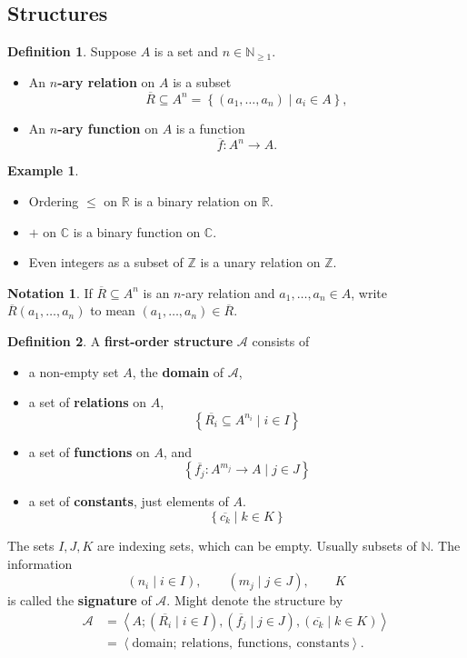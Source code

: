 \documentclass{article}
\newcommand{\N}{\mathbb{N}}
\newcommand{\Z}{\mathbb{Z}}
\newcommand{\R}{\mathbb{R}}
\newcommand{\C}{\mathbb{C}}
\newcommand{\A}{\mathcal{A}}
\newcommand{\rb}[1]{\left( #1 \right)}
\newcommand{\cb}[1]{\left\{ #1 \right\}}
\newcommand{\ab}[1]{\left\langle #1 \right\rangle}
\theoremstyle{definition}\newtheorem{definition}{Definition}[subsection]
\theoremstyle{definition}\newtheorem{remark1}[definition]{Remark}
\theoremstyle{definition}\newtheorem{example1}[definition]{Example}
\theoremstyle{definition}\newtheorem*{remark2}{Remark}
\theoremstyle{definition}\newtheorem*{example2}{Example}
\theoremstyle{definition}\newtheorem*{note}{Note}
\theoremstyle{definition}\newtheorem*{notation}{Notation}
\begin{document}
\subsection{Structures}

\begin{definition}
Suppose $ A $ is a set and $ n \in \N_{\ge 1} $.
\begin{itemize}
\item An \textbf{$ n $-ary relation} on $ A $ is a subset
$$ \overline{R} \subseteq A^n = \cb{\rb{a_1, \dots, a_n} \mid a_i \in A}, $$
\item An \textbf{$ n $-ary function} on $ A $ is a function
$$ \overline{f} : A^n \to A. $$
\end{itemize}
\end{definition}

\begin{example2}
\hfill
\begin{itemize}
\item Ordering $ \le $ on $ \R $ is a binary relation on $ \R $.
\item $ + $ on $ \C $ is a binary function on $ \C $.
\item Even integers as a subset of $ \Z $ is a unary relation on $ \Z $.
\end{itemize}
\end{example2}

\begin{notation}
If $ \overline{R} \subseteq A^n $ is an $ n $-ary relation and $ a_1, \dots, a_n \in A $, write $ \overline{R}\rb{a_1, \dots, a_n} $ to mean $ \rb{a_1, \dots, a_n} \in \overline{R} $.
\end{notation}

\begin{definition}
A \textbf{first-order structure} $ \A $ consists of
\begin{itemize}
\item a non-empty set $ A $, the \textbf{domain} of $ \A $,
\item a set of \textbf{relations} on $ A $,
$$ \cb{\overline{R_i} \subseteq A^{n_i} \mid i \in I} $$
\item a set of \textbf{functions} on $ A $, and
$$ \cb{\overline{f_j} : A^{m_j} \to A \mid j \in J} $$
\item a set of \textbf{constants}, just elements of $ A $.
$$ \cb{\overline{c_k} \mid k \in K} $$
\end{itemize}
The sets $ I, J, K $ are indexing sets, which can be empty. Usually subsets of $ \N $. The information
$$ \rb{n_i \mid i \in I}, \qquad \rb{m_j \mid j \in J}, \qquad K $$
is called the \textbf{signature} of $ \A $. Might denote the structure by
\begin{align*}
\A
& = \ab{A; \rb{\overline{R_i} \mid i \in I}, \rb{\overline{f_j} \mid j \in J}, \rb{\overline{c_k} \mid k \in K}} \\
& = \ab{\text{domain}; \ \text{relations}, \ \text{functions}, \ \text{constants}}.
\end{align*}
\end{definition}
\end{document}
